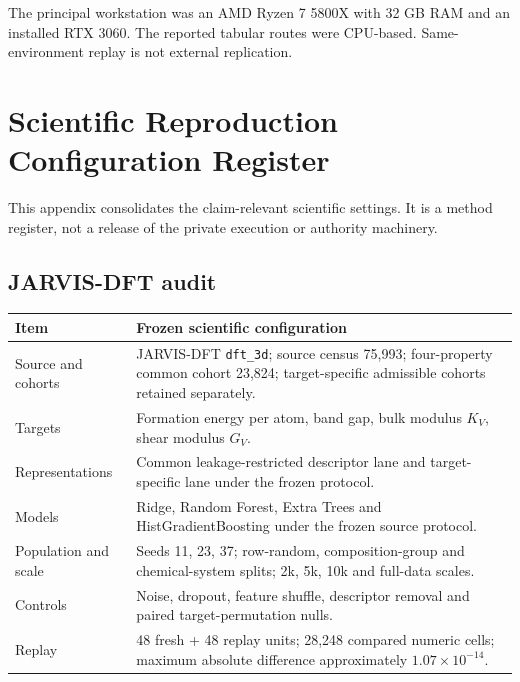 \documentclass[11pt,a4paper,oneside]{report}
\begin{document}
The principal workstation was an AMD Ryzen 7 5800X with 32 GB RAM and an installed
RTX 3060. The reported tabular routes were CPU-based. Same-environment replay is not
external replication.


\chapter{Scientific Reproduction Configuration Register}
\label{app:scientific-config}
This appendix consolidates the claim-relevant scientific settings. It is a method register, not a release of the private execution or authority machinery.

\section*{JARVIS-DFT audit}
\begin{longtable}{p{}p{}}
\toprule Item & Frozen scientific configuration\\\midrule
Source and cohorts & JARVIS-DFT \texttt{dft\_3d}; source census 75,993; four-property common cohort 23,824; target-specific admissible cohorts retained separately.\\
Targets & Formation energy per atom, band gap, bulk modulus $K_V$, shear modulus $G_V$.\\
Representations & Common leakage-restricted descriptor lane and target-specific lane under the frozen protocol.\\
Models & Ridge, Random Forest, Extra Trees and HistGradientBoosting under the frozen source protocol.\\
Population and scale & Seeds 11, 23, 37; row-random, composition-group and chemical-system splits; 2k, 5k, 10k and full-data scales.\\
Controls & Noise, dropout, feature shuffle, descriptor removal and paired target-permutation nulls.\\
Replay & 48 fresh + 48 replay units; 28,248 compared numeric cells; maximum absolute difference approximately $1.07\times10^{-14}$.\\
\bottomrule
\end{longtable}
\end{document}
